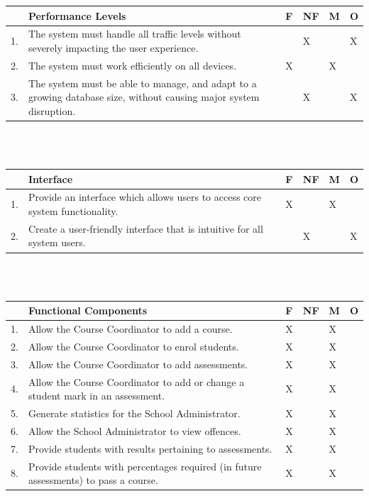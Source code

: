 \documentclass[paper=a4, fontsize=11pt]{scrartcl}
\numberwithin{equation}{section}		%
\numberwithin{figure}{section}			%
\numberwithin{table}{section}				%
\begin{document}
\begin{tabular}{|p{1cm}|p{9.5cm}|p{0.5cm}|p{0.5cm}|p{0.5cm}|p{0.5cm}|}
\hline  & \textbf{Performance Levels} & F & NF & M & O \\ 
\hline 1. & The system must handle all traffic levels without severely impacting the user experience. &  & X &  & X \\ 
\hline 2. & The system must work efficiently on all devices.  & X &  & X &  \\ 
\hline 3. &The system must be able to manage, and adapt to a growing database size, without causing major system disruption. &  & X &  & X \\ 
\hline 
\end{tabular} 
\\\\

\begin{tabular}{|p{1cm}|p{9.5cm}|p{0.5cm}|p{0.5cm}|p{0.5cm}|p{0.5cm}|}
\hline  & \textbf{Interface} & F & NF & M & O \\ 
\hline 1. & Provide an interface which allows users to access core    system functionality. & X &  & X &  \\ 
\hline 2. & Create a user-friendly interface that is intuitive for all system users.  &  & X &  & X \\
\hline 
\end{tabular} 
\\\\

\begin{tabular}{|p{1cm}|p{9.5cm}|p{0.5cm}|p{0.5cm}|p{0.5cm}|p{0.5cm}|}
\hline  & \textbf{Functional Components} & F & NF & M & O \\ 
\hline 1. & Allow the Course Coordinator to add a course. & X &  & X &  \\ 
\hline 2. & Allow the Course Coordinator to enrol students.  & X &  & X &  \\ 
\hline 3. & Allow the Course Coordinator to add assessments. & X &  & X &  \\ 
\hline 4. & Allow the Course Coordinator to add or change a student mark in an assessment.  & X &  & X &  \\ 
\hline 5. & Generate statistics for the School Administrator. & X &  & X &  \\ 
\hline 6. & Allow the School Administrator to view offences. & X &  & X &  \\ 
\hline 7. & Provide students with results pertaining to assessments. & X &  & X &  \\ 
\hline 8. & Provide students with percentages required (in future assessments) to pass a course. & X &  & X &  \\ 
\hline 
\end{tabular} 
\\\\
\end{document}
